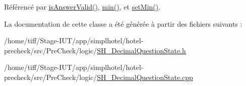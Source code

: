 Référencé par \hyperlink{classSH__DecimalQuestionState_a99f815a5101340867400f093e89f2210}{is\-Answer\-Valid()}, \hyperlink{classSH__DecimalQuestionState_ac909214eeb0e370c16718cb698bfec2c}{min()}, et \hyperlink{classSH__DecimalQuestionState_a2b0fa48a8e0609bb2db7776ce1240a86}{set\-Min()}.



La documentation de cette classe a été générée à partir des fichiers suivants \-:\begin{DoxyCompactItemize}
\item 
/home/tiff/\-Stage-\/\-I\-U\-T/app/simplhotel/hotel-\/precheck/src/\-Pre\-Check/logic/\hyperlink{SH__DecimalQuestionState_8h}{S\-H\-\_\-\-Decimal\-Question\-State.\-h}\item 
/home/tiff/\-Stage-\/\-I\-U\-T/app/simplhotel/hotel-\/precheck/src/\-Pre\-Check/logic/\hyperlink{SH__DecimalQuestionState_8cpp}{S\-H\-\_\-\-Decimal\-Question\-State.\-cpp}\end{DoxyCompactItemize}
